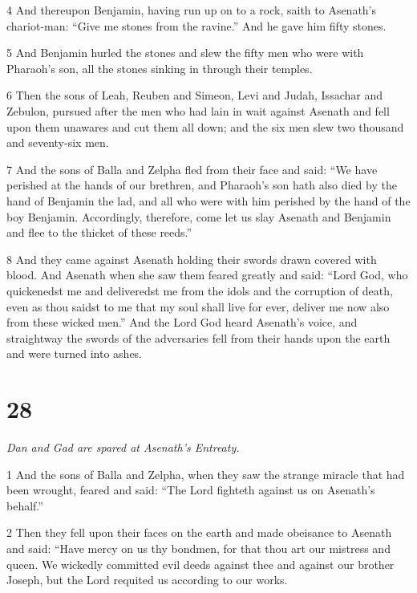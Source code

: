 \par 4 And thereupon Benjamin, having run up on to a rock, saith to Asenath's chariot-man: “Give me stones from the ravine.” And he gave him fifty stones. 

\par 5 And Benjamin hurled the stones and slew the fifty men who were with Pharaoh's son, all the stones sinking in through their temples. 

\par 6 Then the sons of Leah, Reuben and Simeon, Levi and Judah, Issachar and Zebulon, pursued after the men who had lain in wait against Asenath and fell upon them unawares and cut them all down; and the six men slew two thousand and seventy-six men. 

\par 7 And the sons of Balla and Zelpha fled from their face and said: “We have perished at the hands of our brethren, and Pharaoh's son hath also died by the hand of Benjamin the lad, and all who were with him perished by the hand of the boy Benjamin. Accordingly, therefore, come let us slay Asenath and Benjamin and flee to the thicket of these reeds.” 

\par 8 And they came against Asenath holding their swords drawn covered with blood. And Asenath when she saw them feared greatly and said: “Lord God, who quickenedst me and deliveredst me from the idols and the corruption of death, even as thou saidst to me that my soul shall live for ever, deliver me now also from these wicked men.” And the Lord God heard Asenath's voice, and straightway the swords of the adversaries fell from their hands upon the earth and were turned into ashes.

\chapter{28}

\par \textit{Dan and Gad are spared at Asenath's Entreaty.}


\par 1 And the sons of Balla and Zelpha, when they saw the strange miracle that had been wrought, feared and said: “The Lord fighteth against us on Asenath's behalf.” 

\par 2 Then they fell upon their faces on the earth and made obeisance to Asenath and said: “Have mercy on us thy bondmen, for that thou art our mistress and queen. We wickedly committed evil deeds against thee and against our brother Joseph, but the Lord requited us according to our works. 

